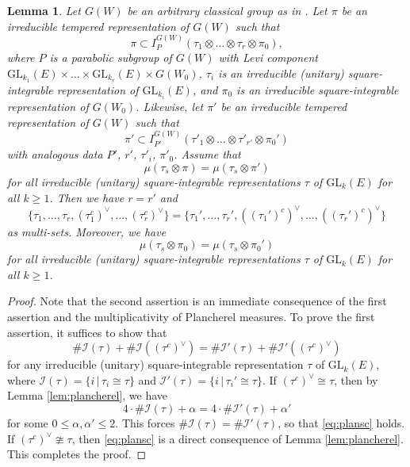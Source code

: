 \documentclass[11pt]{amsart}
\numberwithin{equation}{section}
\theoremstyle{plain}
\newtheorem{lem}[thm]{Lemma}
\theoremstyle{definition}
\theoremstyle{remark}
\def\GL{\mathrm{GL}}
\begin{document}
\begin{lem}
\label{L:plansc}
Let $G(W)$ be an arbitrary classical group as in \cite[\S 2]{gi}.
Let $\pi$ be an irreducible tempered representation of $G(W)$ such that
\[
 \pi \subset I^{G(W)}_P(\tau_1 \otimes \dots \otimes \tau_r \otimes \pi_0),
\]
where $P$ is a parabolic subgroup of $G(W)$ with Levi component $\GL_{k_1}(E) \times \dots \times \GL_{k_r}(E) \times G(W_0)$, $\tau_i$ is an irreducible (unitary) square-integrable representation of $\GL_{k_i}(E)$, and $\pi_0$ is an irreducible square-integrable representation of $G(W_0)$.
Likewise, let $\pi'$ be an irreducible tempered representation of $G(W)$ such that
\[
 \pi' \subset I^{G(W)}_{P'}(\tau'_1 \otimes \dots \otimes \tau'_{r'} \otimes \pi_0')
\]
with analogous data $P'$, $r'$, $\tau'_i$, $\pi'_0$.
Assume that
\[
 \mu(\tau_s \otimes \pi) = \mu(\tau_s \otimes \pi')
\]
for all irreducible (unitary) square-integrable representations $\tau$ of $\GL_k(E)$ for all $k \ge 1$.
Then we have $r=r'$ and 
\[
 \{ \tau_1, \dots, \tau_r, (\tau_1^c)^\vee, \dots, (\tau_r^c)^\vee \} = \{ \tau_1', \dots, \tau_r', ((\tau_1')^c)^\vee, \dots, ((\tau_r')^c)^\vee \}
\]
as multi-sets.
Moreover, we have
\[ 
 \mu(\tau_s \otimes \pi_0) = \mu(\tau_s \otimes \pi_0')
\]
for all irreducible (unitary) square-integrable representations $\tau$ of $\GL_k(E)$ for all $k \ge 1$.
\end{lem}

\begin{proof}
Note that the second assertion is an immediate consequence of the first assertion and the multiplicativity of Plancherel measures.
To prove the first assertion, it suffices to show that
\begin{equation}
\label{eq:plansc}
 \# \mathcal{I}(\tau) + \# \mathcal{I}((\tau^c)^\vee) = \# \mathcal{I}'(\tau) + \# \mathcal{I}'((\tau^c)^\vee) 
\end{equation}
for any irreducible (unitary) square-integrable representation $\tau$ of $\GL_k(E)$, where $\mathcal{I}(\tau) = \{ i \, | \, \tau_i \cong \tau \}$ and $\mathcal{I}'(\tau) = \{ i \, | \, \tau_i' \cong \tau \}$.
If $(\tau^c)^\vee \cong \tau$, then by Lemma \ref{lem:plancherel}, we have
\[
 4 \cdot \# \mathcal{I}(\tau) + \alpha = 4 \cdot \# \mathcal{I}'(\tau) + \alpha'
\]
for some $0 \le \alpha, \alpha' \le 2$.
This forces $\# \mathcal{I}(\tau) = \# \mathcal{I}'(\tau)$, so that \eqref{eq:plansc} holds.
If $(\tau^c)^\vee \ncong \tau$, then \eqref{eq:plansc} is a direct consequence of Lemma \ref{lem:plancherel}.
This completes the proof.
\end{proof}
\end{document}
